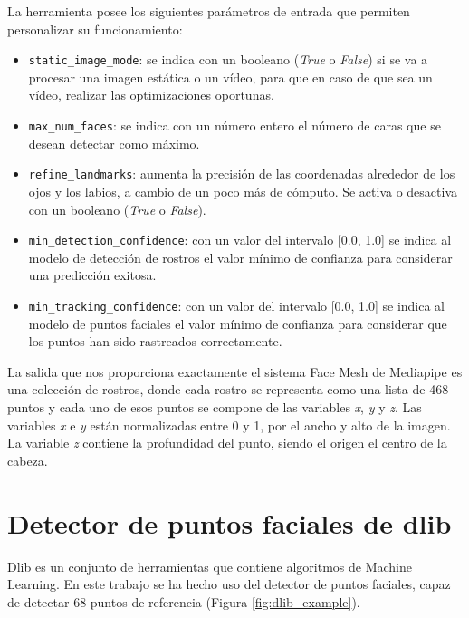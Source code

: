 La herramienta posee los siguientes parámetros de entrada que permiten personalizar su funcionamiento:
\begin{itemize}
    \item \verb|static_image_mode|: se indica con un booleano (\textit{True} o \textit{False}) si se va a procesar una imagen estática o un vídeo, para que en caso de que sea un vídeo, realizar las optimizaciones oportunas.
    
    \item \verb|max_num_faces|: se indica con un número entero el número de caras que se desean detectar como máximo.
    
    \item \verb|refine_landmarks|: aumenta la precisión de las coordenadas alrededor de los ojos y los labios, a cambio de un poco más de cómputo. Se activa o desactiva con un booleano (\textit{True} o \textit{False}).
    
    \item \verb|min_detection_confidence|: con un valor del intervalo [0.0, 1.0] se indica al modelo de detección de rostros el valor mínimo de confianza para considerar una predicción exitosa.
    
    \item \verb|min_tracking_confidence|: con un valor del intervalo [0.0, 1.0] se indica al modelo de puntos faciales el valor mínimo de confianza para considerar que los puntos han sido rastreados correctamente.
\end{itemize}

La salida que nos proporciona exactamente el sistema Face Mesh de Mediapipe es una colección de rostros, donde cada rostro se representa como una lista de 468 puntos y cada uno de esos puntos se compone de las variables \textit{x}, \textit{y} y \textit{z}. Las variables \textit{x} e \textit{y} están normalizadas entre 0 y 1, por el ancho y alto de la imagen. La variable \textit{z} contiene la profundidad del punto, siendo el origen el centro de la cabeza.

\section{Detector de puntos faciales de dlib}
\label{sec:dlib}

Dlib es un conjunto de herramientas que contiene algoritmos de Machine Learning. En este trabajo se ha hecho uso del detector de puntos faciales, capaz de detectar 68 puntos de referencia (Figura \ref{fig:dlib_example}).\\

